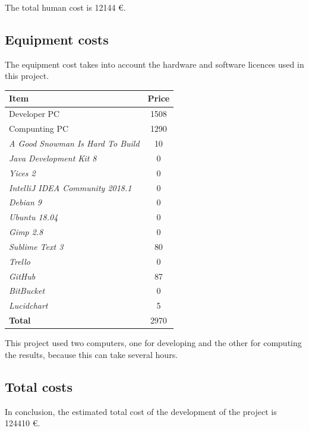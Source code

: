 \documentclass{report}
\theoremstyle{plain}
\begin{document}
The total human cost is 12144 \euro.

\subsection{Equipment costs}
The equipment cost takes into account the hardware and software licences used in this project.

\vspace{1\baselineskip}

\begin{tabular}{||l|c||}
    \hline
    \textbf{Item} & \textbf{Price}\\
    \hline\hline
    Developer PC & 1508 \\
    \hline
    Compunting PC & 1290 \\
    \hline
    \emph{A Good Snowman Is Hard To Build} & 10 \\
    \hline
    \emph{Java Development Kit 8} & 0 \\
    \hline 
    \emph{Yices 2} & 0 \\
    \hline 
    \emph{IntelliJ IDEA Community 2018.1} & 0 \\
    \hline
    \emph{Debian 9} & 0 \\
    \hline
    \emph{Ubuntu 18.04} & 0 \\
    \hline
    \emph{Gimp 2.8} & 0 \\
    \hline
    \emph{Sublime Text 3} & 80 \\
    \hline
    \emph{Trello} & 0 \\
    \hline
    \emph{GitHub} & 87 \\
    \hline
    \emph{BitBucket} & 0 \\
    \hline
    \emph{Lucidchart} & 5 \\
    \hline\hline
    \textbf{Total} & 2970 \\
    \hline
\end{tabular}

\vspace{1\baselineskip}

This project used two computers, one for developing and the other for computing the results, because this can take several hours.

\subsection{Total costs}
In conclusion, the estimated total cost of the development of the project is 124410 \euro.
\end{document}
